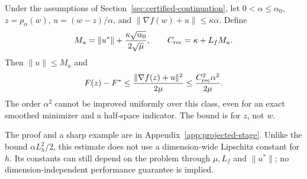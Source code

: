 \begin{theorem}\label{thm:projected-stage}
Under the assumptions of Section~\ref{sec:certified-continuation}, let $0<\alpha\le\alpha_0$, $z=p_\alpha(w)$, $u=(w-z)/\alpha$, and $\|\nabla f(w)+u\|\le\kappa\alpha$. Define
\[
M_u=\|u^*\|+\frac{\kappa\sqrt{\alpha_0}}{2\sqrt\mu},\qquad C_{\rm rec}=\kappa+L_fM_u.
\]
Then $\|u\|\le M_u$ and
\begin{equation}\label{eq:quadratic-stage}
F(z)-F^*\le \frac{\|\nabla f(z)+u\|^2}{2\mu}
\le \frac{C_{\rm rec}^2\alpha^2}{2\mu}.
\end{equation}
The order $\alpha^2$ cannot be improved uniformly over this class, even for an exact smoothed minimizer and a half-space indicator. The bound is for $z$, not $w$.
\end{theorem}
The proof and a sharp example are in Appendix~\ref{app:projected-stage}. Unlike the bound $\alpha L_h^2/2$, this estimate does not use a dimension-wide Lipschitz constant for $h$. Its constants can still depend on the problem through $\mu,L_f$ and $\|u^*\|$; no dimension-independent performance guarantee is implied.

